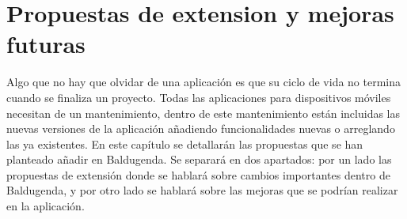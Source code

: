 \chapter{Propuestas de extension y mejoras futuras}

Algo que no hay que olvidar de una aplicación es que su ciclo de vida no termina cuando se finaliza un proyecto. Todas las aplicaciones para dispositivos móviles necesitan de un mantenimiento, dentro de este mantenimiento están incluidas las nuevas versiones de la aplicación añadiendo funcionalidades nuevas o arreglando las ya existentes.
En este capítulo se detallarán las propuestas que se han planteado añadir en Baldugenda.
Se separará en dos apartados: por un lado las propuestas de extensión donde se hablará sobre cambios importantes dentro de Baldugenda, y por otro lado se hablará sobre las mejoras que se podrían realizar en la aplicación.
\newpage

\newpage

